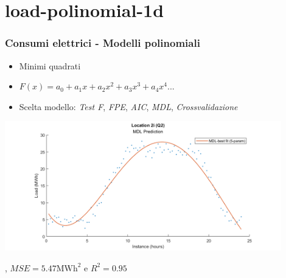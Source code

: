\documentclass{beamer}
\begin{document}
\begin{frame}
\end{frame}

\section{load-polinomial-1d}
\begin{frame}
    \frametitle{Consumi elettrici - Modelli polinomiali}
    \vfill    
    \begin{itemize}
        \item Minimi quadrati
        \item $F(x)=a_0+a_1x+a_2x^2+a_3x^3+a_4x^4...$        
        \item Scelta modello: 
            \textit{Test F}, 
            \textit{FPE}, 
            \textit{AIC}, 
            \textit{MDL}, 
            \textit{Crossvalidazione}
    \end{itemize}
    \vfill
    \centering
    \includegraphics[width=0.9\textwidth,keepaspectratio]{2_i_q2_MDL_poli.png}     

    \scriptsize {}, $MSE=5.47\text{MWh}^2$ e $R^2=0.95$
\end{frame}
\end{document}
